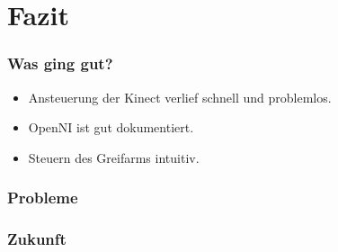 \section{Fazit}
\begin{frame}
\frametitle{Was ging gut?}
\begin{itemize}
\item Ansteuerung der Kinect verlief schnell und problemlos.
\item OpenNI ist gut dokumentiert.
\item Steuern des Greifarms intuitiv.
\end{itemize}
\end{frame}



\begin{frame}
\frametitle{Probleme}
\end{frame}


\begin{frame}
\frametitle{Zukunft}
\end{frame}